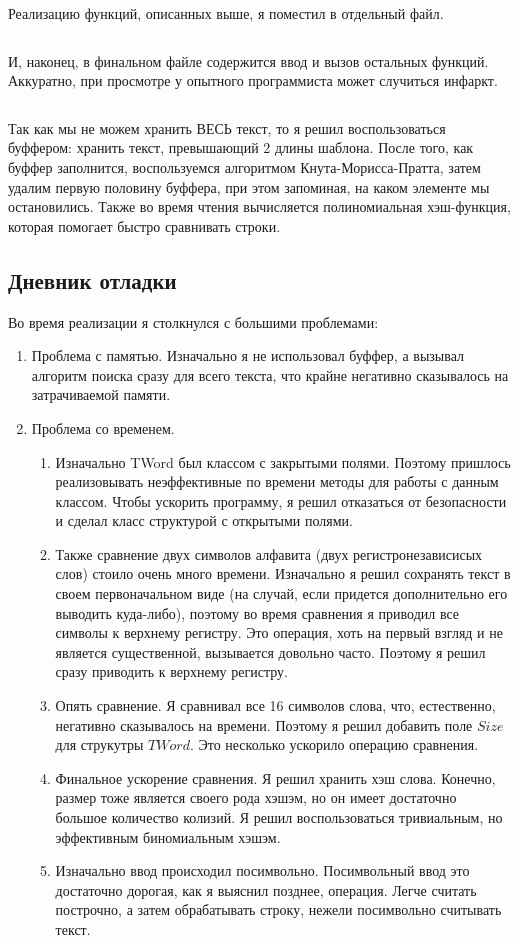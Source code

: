 \documentclass[12pt]{article}
\begin{document}
	\inputminted{C++}{../src/TWord.hpp}
	
	Реализацию функций, описанных выше, я поместил в отдельный файл.
	
	\inputminted{C++}{../src/TWord.cpp}
	 
	И, наконец, в финальном файле содержится ввод и вызов остальных функций. Аккуратно, при просмотре у опытного программиста может случиться инфаркт.
	
	\inputminted{C++}{../src/main.cpp}
	
	Так как мы не можем хранить ВЕСЬ текст, то я решил воспользоваться буффером: хранить текст, превышающий 2 длины шаблона. После того, как буффер заполнится, воспользуемся алгоритмом Кнута-Морисса-Пратта, затем удалим первую половину буффера, при этом запоминая, на каком элементе мы остановились. Также во время чтения вычисляется полиномиальная хэш-функция, которая помогает быстро сравнивать строки.
	
	\subsection*{Дневник отладки}
	Во время реализации я столкнулся с большими проблемами:
	\begin{enumerate}
		\item Проблема с памятью. Изначально я не использовал буффер, а вызывал алгоритм поиска сразу для всего текста, что крайне негативно сказывалось на затрачиваемой памяти.
		\item Проблема со временем.
		\begin{enumerate}
			\item Изначально TWord был классом с закрытыми полями. Поэтому пришлось реализовывать неэффективные по времени методы для работы с данным классом. Чтобы ускорить программу, я решил отказаться от безопасности и сделал класс структурой с открытыми полями.
			\item Также сравнение двух символов алфавита (двух регистронезависисых слов) стоило очень много времени. Изначально я решил сохранять текст в своем первоначальном виде (на случай, если придется дополнительно его выводить куда-либо), поэтому во время сравнения я приводил все символы к верхнему регистру. Это операция, хоть на первый взгляд и не является существенной, вызывается довольно часто. Поэтому я решил сразу приводить к верхнему регистру.
			\item Опять сравнение. Я сравнивал все 16 символов слова, что, естественно, негативно сказывалось на времени. Поэтому я решил добавить поле $Size$ для струкутры $TWord$. Это несколько ускорило операцию сравнения.
			\item Финальное ускорение сравнения. Я решил хранить хэш слова. Конечно, размер тоже является своего рода хэшэм, но он имеет достаточно большое количество колизий. Я решил воспользоваться тривиальным, но эффективным биномиальным хэшэм.
			\item Изначально ввод происходил посимвольно. Посимвольный ввод это достаточно дорогая, как я выяснил позднее, операция. Легче считать построчно, а затем обрабатывать строку, нежели посимвольно считывать текст.
		\end{enumerate}
	\end{enumerate}
\end{document}
